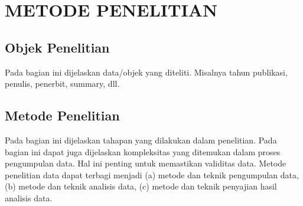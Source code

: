 \chapter{METODE PENELITIAN}

\section{Objek Penelitian}
Pada bagian ini dijelaskan data/objek yang diteliti. Misalnya tahun publikasi, penulis, penerbit, summary, dll.

\section{Metode Penelitian}
Pada bagian ini dijelaskan tahapan yang dilakukan dalam penelitian. Pada bagian ini dapat juga dijelaskan kompleksitas yang ditemukan dalam proses pengumpulan data. Hal ini penting untuk memastikan validitas data. Metode penelitian data dapat terbagi menjadi (a) metode dan teknik pengumpulan data, (b) metode dan teknik analisis data, (c) metode dan teknik penyajian hasil analisis data.

